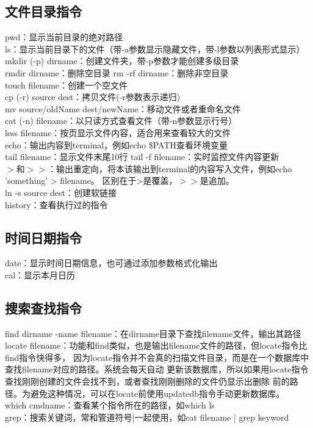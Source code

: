 \documentclass[11pt]{article}
\begin{document}
\subsection{文件目录指令}

pwd：显示当前目录的绝对路径 \\
ls：显示当前目录下的文件（带-a参数显示隐藏文件，带-l参数以列表形式显示） \\
mkdir (-p) dirname：创建文件夹，带-p参数才能创建多级目录  \\
rmdir dirname：删除空目录 \qquad rm -rf dirname：删除非空目录  \\
touch filename：创建一个空文件 \\
cp (-r) source dest：拷贝文件(-r参数表示递归)  \\
mv source/oldName dest/newName：移动文件或者重命名文件  \\
cat (-n) filename：以只读方式查看文件（带-n参数显示行号）  \\
less filename：按页显示文件内容，适合用来查看较大的文件  \\
echo：输出内容到terminal，例如echo \$PATH查看环境变量 \\
tail filename：显示文件末尾10行 \qquad tail -f filename：实时监控文件内容更新 \\
$>$和$>>$：输出重定向，将本该输出到terminal的内容写入文件，例如echo 'something' > filename。
区别在于>是覆盖，$>>$是追加。  \\
ln -s source dest：创建软链接  \\
history：查看执行过的指令

\subsection{时间日期指令}
date：显示时间日期信息，也可通过添加参数格式化输出  \\
cal：显示本月日历

\subsection{搜索查找指令}
find dirname -name filename：在dirname目录下查找filename文件，输出其路径 \\
locate filename：功能和find类似，也是输出filename文件的路径，但locate指令比find指令快得多，
因为locate指令并不会真的扫描文件目录，而是在一个数据库中查找filename对应的路径。系统会每天自动
更新该数据库，所以如果用locate指令查找刚刚创建的文件会找不到，或者查找刚刚删除的文件仍显示出删除
前的路径。为避免这种情况，可以在locate前使用updatedb指令手动更新数据库。  \\
which cmdname：查看某个指令所在的路径，如which ls  \\
grep：搜索关键词，常和管道符号|一起使用，如cat filename | grep keyword
\end{document}
